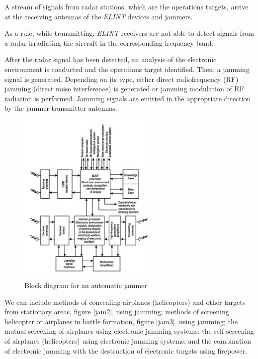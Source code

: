 \documentclass[english,purist]{ist-report}
\begin{document}
A stream of signals from radar stations, which are the operations targets, arrive at the receiving antennas of the \textit{ELINT} devices and jammers. 

As a rule, while transmitting, \textit{ELINT} receivers are not able to detect signals from a radar irradiating the aircraft in the corresponding frequency band. 

After the radar signal has been detected, an analysis of the electronic environment is conducted and the operations target identified. Then, a jamming signal is generated. Depending on its type, either direct radiofrequency (RF) jamming (direct noise interference) is generated or jamming modulation of RF radiation is performed. Jamming signals are emitted in the appropriate direction by the jammer transmitter antennas. 



\begin{figure}[ht]
\centering
\includegraphics[width=0.6\textwidth]{jam1.png}
\caption{Block diagram for an automatic jammer}
\label{jam1}
\end{figure} 

We can include methods of concealing airplanes (helicopters) and other targets from stationary areas, figure \ref{jam2}, using jamming; methods of screening helicopter or airplanes in battle formation, figure \ref{jam3}, using jamming; the mutual screening of airplanes
using electronic jamming systems; the self-screening of airplanes (helicopters) using electronic jamming systems; and the combination of electronic jamming with the destruction of electronic targets using firepower. 
\end{document}
